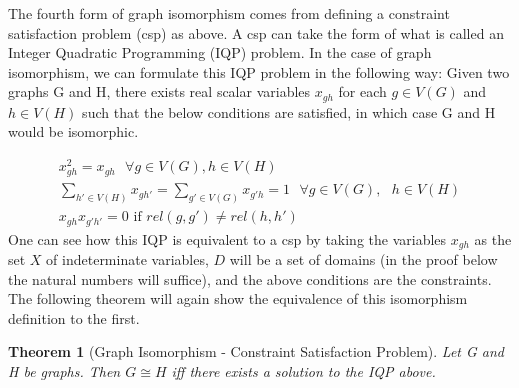 \documentclass[12pt]{article}
\newtheorem{thm}{Theorem}[section]
\begin{document}
The fourth form of graph isomorphism comes from defining a constraint satisfaction problem (csp) as above. A csp can take the form of what is called an Integer Quadratic Programming (IQP) problem. In the case of graph isomorphism, we can formulate this IQP problem in the following way: Given two graphs G and H, there exists real scalar variables $x_{gh}$ for each $g \in V(G)$ and $h \in V(H)$ such that the below conditions are satisfied, in which case G and H would be isomorphic. 

\begin{subequations}
\label{IQP}
\begin{align}
x_{gh}^2 = x_{gh} \text{  } \forall g \in V(G), h \in V(H)
\\
\sum_{h' \in V(H)} x_{gh'} = \sum_{g' \in V(G)} x_{g'h} = 1 \text{  } \forall g \in V(G), \text{  } h \in V(H)
\\
x_{gh}x_{g'h'} = 0 \text{ if } rel(g, g') \neq rel(h, h')
\end{align}
\end{subequations}
One can see how this IQP is equivalent to a csp by taking the variables $x_{gh}$ as the set $X$ of indeterminate variables, $D$ will be a set of domains (in the proof below the natural numbers will suffice), and the above conditions are the constraints. The following theorem will again show the equivalence of this isomorphism definition to the first.

\begin{thm}[Graph Isomorphism - Constraint Satisfaction Problem]
Let G and H be graphs. Then $G \cong H$ iff there exists a solution to the IQP above.
\end{thm}
\end{document}
